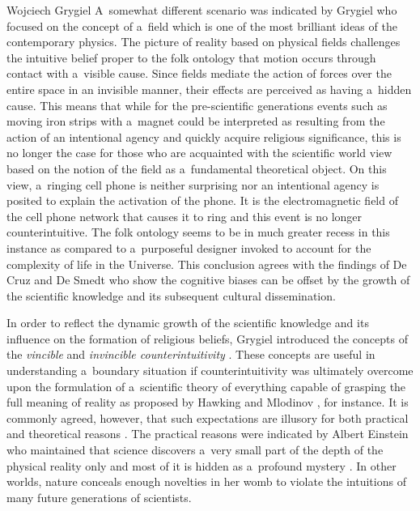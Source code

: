 \begin{artengenv}{Wojciech Grygiel}
A~somewhat different scenario was indicated by Grygiel
\parencite*[][]{grygiel_doctrine_2020} %
 who focused on the concept of a~field which is one of the most brilliant ideas of the contemporary physics. The picture of reality based on physical fields challenges the intuitive belief proper to the folk ontology that motion occurs through contact with a~visible cause. Since fields mediate the action of forces over the entire space in an invisible manner, their effects are perceived as having a~hidden cause. This means that while for the pre-scientific generations events such as moving iron strips with a~magnet could be interpreted as resulting from the action of an intentional agency and quickly acquire religious significance, this is no longer the case for those who are acquainted with the scientific world view based on the notion of the field as a~fundamental theoretical object. On this view, a~ringing cell phone is neither surprising nor an intentional agency is posited to explain the activation of the phone. It is the electromagnetic field of the cell phone network that causes it to ring and this event is no longer counterintuitive. The folk ontology seems to be in much greater recess in this instance as compared to a~purposeful designer invoked to account for the complexity of life in the Universe. This conclusion agrees with the findings of De Cruz and De Smedt 
\parencite*[][]{de_cruz_evolved_2012} %
 who show the cognitive biases can be offset by the growth of the scientific knowledge and its subsequent cultural dissemination.

In order to reflect the dynamic growth of the scientific knowledge and its influence on the formation of religious beliefs, Grygiel introduced the concepts of the \textit{vincible} and \textit{invincible counterintuitivity}
\parencites[][]{grygiel_science_2017}[see also][]{van_eyghen_religious_2020}. %
 These concepts are useful in understanding a~boundary situation if counterintuitivity was ultimately overcome upon the formulation of a~scientific theory of everything capable of grasping the full meaning of reality as proposed by Hawking and Mlodinov 
\parencite*[][]{hawking_grand_2010}, %
 for instance. It is commonly agreed, however, that such expectations are illusory for both practical and theoretical reasons 
\parencite[e.g.][]{heller_teorie_2006}. %
 The practical reasons were indicated by Albert Einstein who maintained that science discovers a~very small part of the depth of the physical reality only and most of it is hidden as a~profound mystery 
\parencite[][]{einstein_world_1931}. %
 In other worlds, nature conceals enough novelties in her womb to violate the intuitions of many future generations of scientists.


\end{artengenv}
